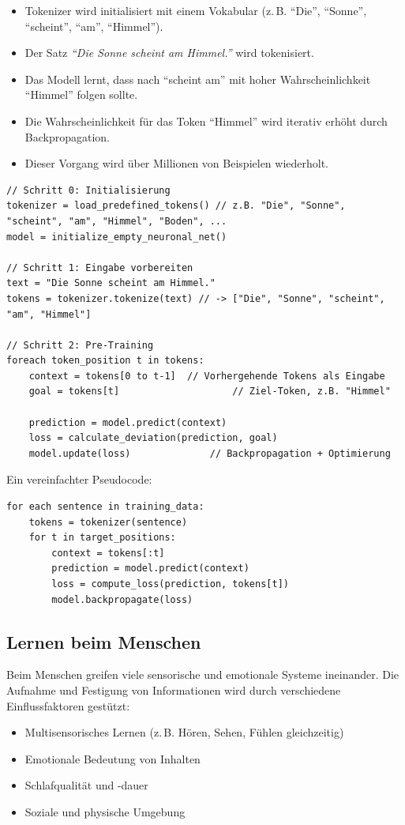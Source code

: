 \begin{itemize}
    \item Tokenizer wird initialisiert mit einem Vokabular (z.\,B. ``Die'', ``Sonne'', ``scheint'', ``am'', ``Himmel'').
    \item Der Satz \textit{``Die Sonne scheint am Himmel.''} wird tokenisiert.
    \item Das Modell lernt, dass nach ``scheint am'' mit hoher Wahrscheinlichkeit ``Himmel'' folgen sollte.
    \item Die Wahrscheinlichkeit für das Token ``Himmel'' wird iterativ erhöht durch Backpropagation.
    \item Dieser Vorgang wird über Millionen von Beispielen wiederholt.
\end{itemize}


\begin{lstlisting}
// Schritt 0: Initialisierung
tokenizer = load_predefined_tokens() // z.B. "Die", "Sonne", "scheint", "am", "Himmel", "Boden", ...
model = initialize_empty_neuronal_net()

// Schritt 1: Eingabe vorbereiten
text = "Die Sonne scheint am Himmel."
tokens = tokenizer.tokenize(text) // -> ["Die", "Sonne", "scheint", "am", "Himmel"]

// Schritt 2: Pre-Training
foreach token_position t in tokens:
	context = tokens[0 to t-1]	// Vorhergehende Tokens als Eingabe
	goal = tokens[t]					// Ziel-Token, z.B. "Himmel"
	
	prediction = model.predict(context)
	loss = calculate_deviation(prediction, goal)
	model.update(loss) 				// Backpropagation + Optimierung

\end{lstlisting}

Ein vereinfachter Pseudocode:

\begin{verbatim}
for each sentence in training_data:
    tokens = tokenizer(sentence)
    for t in target_positions:
        context = tokens[:t]
        prediction = model.predict(context)
        loss = compute_loss(prediction, tokens[t])
        model.backpropagate(loss)
\end{verbatim}

\subsection{Lernen beim Menschen}
Beim Menschen greifen viele sensorische und emotionale Systeme ineinander. Die Aufnahme und Festigung von Informationen wird durch verschiedene Einflussfaktoren gestützt:
\begin{itemize}
    \item Multisensorisches Lernen (z.\,B. Hören, Sehen, Fühlen gleichzeitig)
    \item Emotionale Bedeutung von Inhalten
    \item Schlafqualität und -dauer
    \item Soziale und physische Umgebung
\end{itemize}

